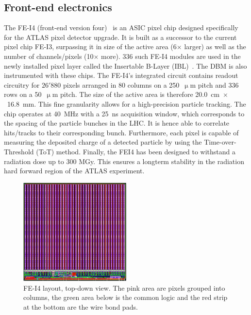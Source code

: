 \subsection{Front-end electronics}
The FE-I4 (front-end version four)~\cite{Albert:1477014} is an ASIC pixel chip designed specifically for the ATLAS pixel detector upgrade. It is built as a successor to the current pixel chip FE-I3, surpassing it in size of the active area (6$\times$ larger) as well as the number of channels/pixels (10$\times$ more). 336 such FE-I4 modules are used in the newly installed pixel layer called the Insertable B-Layer (IBL)~\cite{Huegging:1314083}. The DBM is also instrumented with these chips. The FE-I4's integrated circuit contains readout circuitry for $26'880$ pixels arranged in 80 columns on a 250~$\upmu$m pitch and 336 rows on a 50~$\upmu$m pitch. The size of the active area is therefore 20.0~cm~$\times$~16.8~mm. This fine granularity allows for a high-precision particle tracking. The chip operates at 40~MHz with a 25~ns acquisition window, which corresponds to the spacing of the particle bunches in the LHC. It is hence able to correlate hits/tracks to their corresponding bunch. Furthermore, each pixel is capable of measuring the deposited charge of a detected particle by using the Time-over-Threshold (ToT) method. Finally, the FEI4 has been designed to withstand a radiation dose up to 300 MGy. This ensures a longterm stability in the radiation hard forward region of the ATLAS experiment.

\begin{figure}[!t]
\centering
\includegraphics[width=0.5\textwidth]{04_charge_monitoring/pics/fei41}
\caption{FE-I4 layout, top-down view. The pink area are pixels grouped into columns, the green area below is the common logic and the red strip at the bottom are the wire bond pads.}
\label{fig:anapix}
\end{figure}

